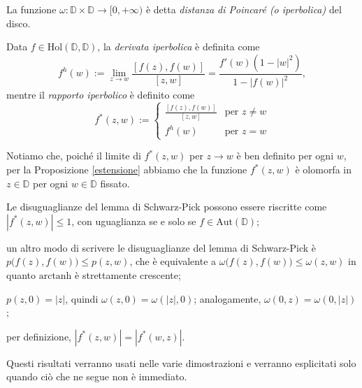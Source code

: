 \begin{defn}
  La funzione $\omega:\mathbb{D}\times \mathbb{D} \longrightarrow [0,+\infty)$ è detta \textit{distanza di Poincaré (o iperbolica)} del disco.
\end{defn}

\begin{defn}
  Data $f \in \text{Hol}(\mathbb{D},\mathbb{D})$, la \textit{derivata iperbolica} è definita come
  $$f^h(w):=\lim_{z \longrightarrow w} \frac{[f(z),f(w)]}{[z,w]}=\frac{f'(w)(1-|w|^2)}{1-|f(w)|^2},$$
  mentre il \textit{rapporto iperbolico} è definito come
  $$f^*(z,w):=\begin{cases}
    \frac{[f(z),f(w)]}{[z,w]} & \mbox{per }z\not=w \\
    f^h(w) & \mbox{per }z=w
  \end{cases}$$
\end{defn}

Notiamo che, poiché il limite di $f^*(z,w)$ per $z \longrightarrow w$ è ben definito per ogni $w$, per la Proposizione \ref{estensione} abbiamo che la funzione $f^*(z,w)$ è olomorfa in $z \in \mathbb{D}$ per ogni $w \in \mathbb{D}$ fissato.

\begin{oss} \label{oss1}
  \begin{nlist}
    \item Le disuguaglianze del lemma di Schwarz-Pick possono essere riscritte come $|f^*(z,w)| \le 1$, con uguaglianza se e solo se $f \in \text{Aut}(\mathbb{D})$;
    \item  un altro modo di scrivere le disuguaglianze del lemma di Schwarz-Pick è $p\bigl(f(z),f(w)\bigr) \le p(z,w)$, che è equivalente a $\omega\bigl(f(z),f(w)\bigr) \le \omega(z,w)$ in quanto $\text{arctanh}$ è strettamente crescente;
    \item $p(z,0)=|z|$, quindi $\omega(z,0)=\omega(|z|,0)$; analogamente, $\omega(0,z)=\omega(0,|z|)$;
    \item per definizione, $|f^*(z,w)|=|f^*(w,z)|$.
  \end{nlist}
  Questi risultati verranno usati nelle varie dimostrazioni e verranno esplicitati solo quando ciò che ne segue non è immediato.
\end{oss}
